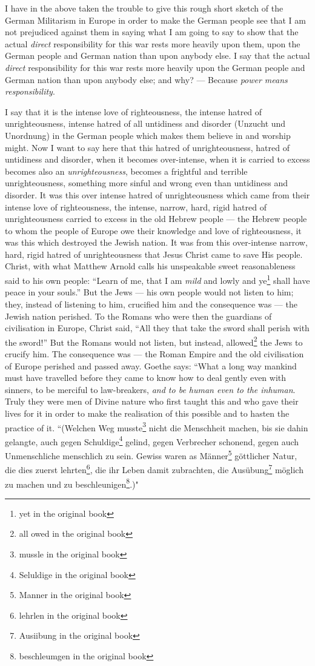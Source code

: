 I have in the above taken the trouble to give this rough short sketch of the German Militarism in Europe in order to make the German people see that I am not prejudiced against them in saying what I am going to say to show that the actual \emph{direct} responsibility for this war rests more heavily upon them, upon the German people and German nation than upon anybody else.
I say that the actual \emph{direct} responsibility for this war rests more heavily upon the German people and German nation than upon anybody else; and why? --- Because \emph{power means responsibility}\cite{num7}. 

I say that it is the intense love of righteousness, the intense hatred of unrighteousness, intense hatred of all untidiness and disorder (Unzucht und Unordnung) in the German people which makes them believe in and worship might.
Now I want to say here that this hatred of unrighteousness, hatred of untidiness and disorder, when it becomes over-intense, when it is carried to excess becomes also an \emph{unrighteousness}, becomes a frightful and terrible unrighteousness, something more sinful and wrong even than untidiness and disorder.
It was this over intense hatred of unrighteousness which came from their intense love of righteousness, the intense, narrow, hard, rigid hatred of unrighteousness carried to excess in the old Hebrew people --- the Hebrew people to whom the people of Europe owe their knowledge and love of righteousness, it was this which destroyed the Jewish nation.
It was from this over-intense narrow, hard, rigid hatred of unrighteousness that Jesus Christ came to save His people.
Christ, with what Matthew Arnold calls his unspeakable sweet reasonableness said to his own people: ``Learn of me, that I am \emph{mild} and lowly and ye\footnote{yet in the original book} shall have peace in your souls.''
But the Jews --- his own people would not listen to him; they, instead of listening to him, crucified him and the consequence was --- the Jewish nation perished.
To the Romans who were then the guardians of civilisation in Europe, Christ said, ``All they that take the sword shall perish with the sword!''\cite{num8} 
But the Romans would not listen, but instead, allowed\footnote{all owed in the original book} the Jews to crucify him.
The consequence was --- the Roman Empire and the old civilisation of Europe perished and passed away.
Goethe says: ``What a long way mankind must have travelled before they came to know how to deal gently even with sinners, to be merciful to law-breakers, \emph{and to be human even to the inhuman}.
Truly they were men of Divine nature who first taught this and who gave their lives for it in order to make the realisation of this possible and to hasten the practice of it.
``(Welchen Weg musste\footnote{mussle in the original book} nicht die Menschheit machen, bis sie dahin gelangte, auch gegen Schuldige\footnote{Seluldige in the original book} gelind, gegen Verbrecher schonend, gegen auch Unmenschliche menschlich zu sein. Gewiss waren as M\"anner\footnote{Manner in the original book} g\"ottlicher Natur, die dies zuerst lehrten\footnote{lehrlen in the original book}, die ihr Leben damit zubrachten, die Aus\"ubung\footnote{Ausiibung in the original book} m\"oglich zu machen und zu beschleunigen\footnote{beschleumgen in the original book}.)"

